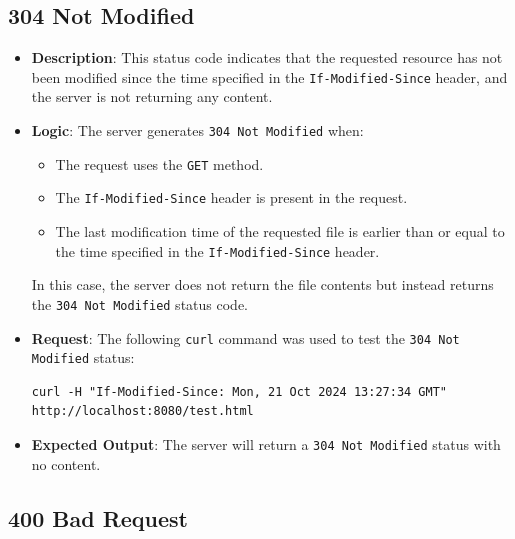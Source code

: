 \documentclass{article}
\begin{document}
\subsection*{304 Not Modified}

\begin{itemize}
    \item \textbf{Description}: This status code indicates that the requested resource has not been modified since the time specified in the \texttt{If-Modified-Since} header, and the server is not returning any content.
    \item \textbf{Logic}: 
    The server generates \texttt{304 Not Modified} when:
    \begin{itemize}
        \item The request uses the \texttt{GET} method.
        \item The \texttt{If-Modified-Since} header is present in the request.
        \item The last modification time of the requested file is earlier than or equal to the time specified in the \texttt{If-Modified-Since} header.
    \end{itemize}
    In this case, the server does not return the file contents but instead returns the \texttt{304 Not Modified} status code.
    \item \textbf{Request}: The following \texttt{curl} command was used to test the \texttt{304 Not Modified} status:
\begin{lstlisting}
curl -H "If-Modified-Since: Mon, 21 Oct 2024 13:27:34 GMT" http://localhost:8080/test.html
\end{lstlisting}
    \item \textbf{Expected Output}: The server will return a \texttt{304 Not Modified} status with no content.
\end{itemize}

\subsection*{400 Bad Request}
\end{document}
